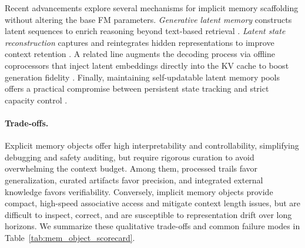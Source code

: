 \documentclass{article}
\let\oldtextcolor\textcolor
\renewcommand{\textcolor}[2]{
  \def\temp{#1}
  \def\red{blue}
  \ifx\temp\red
    \oldtextcolor{black}{#2}
  \else
    \oldtextcolor{#1}{#2}
  \fi
}
\begin{document}
\begin{itemize}[leftmargin=*]
Recent advancements explore several mechanisms for implicit memory scaffolding without altering the base FM parameters. \textit{Generative latent memory} constructs latent sequences to enrich reasoning beyond text-based retrieval \citep{zhang2025memgenweavinggenerativelatent}. \textit{Latent state reconstruction} captures and reintegrates hidden representations to improve context retention \citep{dillon2025contextualmemoryreweavinglarge}. A related line augments the decoding process via offline coprocessors that inject latent embeddings directly into the KV cache to boost generation fidelity \citep{liu2024deliberationlatentspacedifferentiable, sun2025enhancinglatentcomputationtransformers}. Finally, maintaining self-updatable latent memory pools offers a practical compromise between persistent state tracking and strict capacity control \citep{wang2024memoryllmselfupdatablelargelanguage, wang2025mextendingmemoryllmscalable}.

\end{itemize}






\paragraph{Trade-offs.}
Explicit memory objects offer high interpretability and controllability, simplifying debugging and safety auditing, but require rigorous curation to avoid overwhelming the context budget. Among them, processed trails favor generalization, curated artifacts favor precision, and integrated external knowledge favors verifiability. Conversely, implicit memory objects provide compact, high-speed associative access and mitigate context length issues, but are difficult to inspect, correct, and are susceptible to representation drift over long horizons. We summarize these qualitative trade-offs and common failure modes in Table~\ref{tab:mem_object_scorecard}.



\newcommand{\Dfull}{\textcolor{blue!80!black}{\raisebox{0.15ex}{\large$\bullet$}}} 
\newcommand{\Dmid}{\textcolor{cyan!80}{\raisebox{0.15ex}{\large$\bullet$}}} 
\newcommand{\Dnone}{\textcolor{black!10}{\raisebox{0.15ex}{\large$\bullet$}}}


\newcommand{\Hstrut}{\rule{0pt}{3.2ex}}
\end{document}
